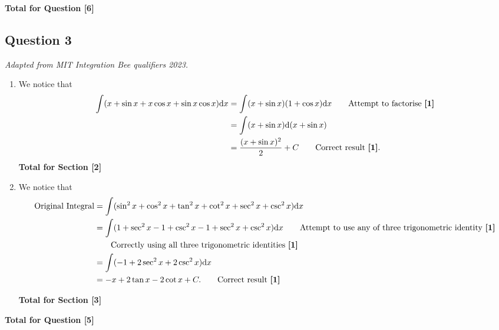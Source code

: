 \documentclass[12pt]{article}
\begin{document}
            \hfill\textbf{Total for Question [6]}
    
        \subsection{Question 3}
            \textit{Adapted from MIT Integration Bee qualifiers 2023.}
            \begin{enumerate}
                \item We notice that
                \begin{align*}
                    \int (x + \sin x + x \cos x + \sin x \cos x) \mathrm{d}x &= \int (x + \sin x)(1 + \cos x) \mathrm{d}x \tag*{Attempt to factorise \textbf{[1]}}\\
                    &= \int (x + \sin x) \mathrm{d} (x + \sin x)\\
                    &= \frac{(x + \sin x)^2}{2} + C \tag*{Correct result \textbf{[1]}}.
                \end{align*}
                \hfill\textbf{Total for Section [2]}

                \item We notice that
                \begin{align*}
                    \text{Original Integral} &= \int (\sin^2 x + \cos^2 x + \tan^2 x + \cot^2 x + \sec^2 x + \csc^2 x) \mathrm{d}x\\
                    &= \int (1 + \sec^2 x - 1 + \csc^2 x - 1 + \sec^2 x + \csc^2 x)\mathrm{d}x \tag*{Attempt to use any  of three trigonometric identity \textbf{[1]}}\\
                    & \tag*{Correctly using all three trigonometric identities \textbf{[1]}}\\
                    &= \int (-1 + 2\sec^2 x + 2\csc^2 x) \mathrm{d}x\\
                    &= -x + 2\tan x - 2\cot x + C. \tag*{Correct result \textbf{[1]}}
                \end{align*}
                
                \hfill\textbf{Total for Section [3]}
            \end{enumerate}
            \hfill\textbf{Total for Question [5]}
    
\end{document}
